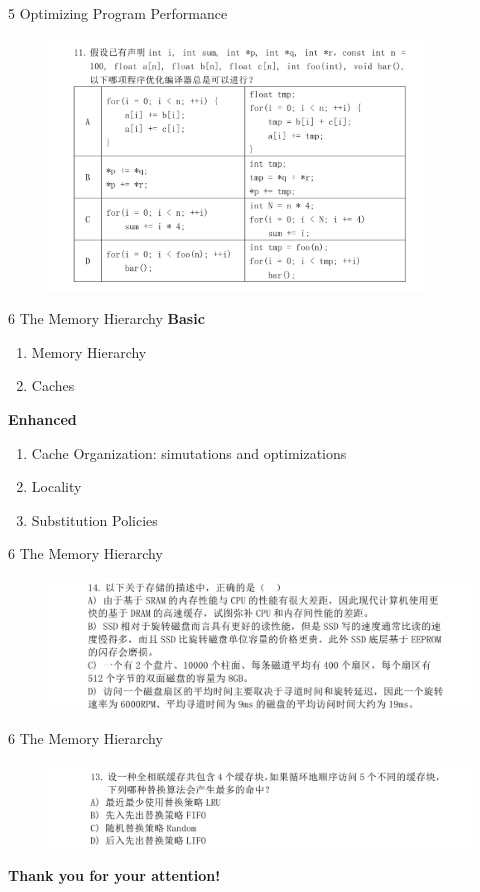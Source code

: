 \documentclass{beamer}
\begin{document}
\begin{frame}{5 Optimizing Program Performance}
	\begin{figure}
		\centering
		\includegraphics[width=0.9\textwidth]{figures/5-0.jpeg}
	\end{figure}
\end{frame}


\begin{frame}{6 The Memory Hierarchy}
\textbf{Basic}
\begin{enumerate}
	\item Memory Hierarchy
	\item Caches
\end{enumerate}
\textbf{Enhanced}
\begin{enumerate}
	\item Cache Organization: simutations and optimizations
	\item Locality
	\item Substitution Policies
\end{enumerate}
\end{frame}

\begin{frame}{6 The Memory Hierarchy}
	\begin{figure}
		\centering
		\includegraphics[width=1.0\textwidth]{figures/6-0.jpeg}
	\end{figure}
\end{frame}

\begin{frame}{6 The Memory Hierarchy}
	\begin{figure}
		\centering
		\includegraphics[width=1.0\textwidth]{figures/6-1.jpeg}
	\end{figure}
\end{frame}
  
\begin{frame}{}
\begin{center}
    \textbf{Thank you for your attention!}
\end{center}
\end{frame}
\end{document}
